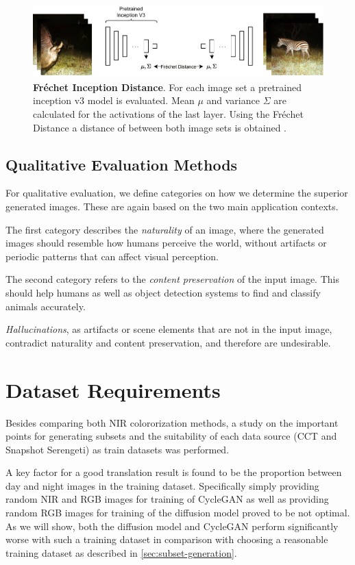 \begin{figure}[htp!]
    \centering
    \includegraphics[width=.9\textwidth]{gfx/FID.pdf}
    \caption{
        \textbf{Fréchet Inception Distance}.
        For each image set a pretrained inception v3 model is evaluated.
        Mean $\mu$ and variance $\Sigma$ are calculated for the activations of the last layer.
        Using the Fréchet Distance a distance of between both image sets is obtained \parencite{ttur}.
    }
    \label{fig:fid}
\end{figure}

\label{sec:evaluate-fid}

\subsection{Qualitative Evaluation Methods}
For qualitative evaluation, we define categories on how we determine the superior generated images. These are again based on the two main application contexts.

The first category describes the \textit{naturality} of an image, where the generated images should resemble how humans perceive the world, without artifacts or periodic patterns that can affect visual perception.

The second category refers to the \textit{content preservation} of the input image. This should help humans as well as object detection systems to find and classify animals accurately.

\textit{Hallucinations}, as artifacts or scene elements that are not in the input image, contradict naturality and content preservation, and therefore are undesirable.

\section{Dataset Requirements}
Besides comparing both NIR colororization methods, a study on the important points for generating subsets and the suitability of each data source
(CCT and Snapshot Serengeti) as train datasets was performed.

\label{sec:time-dependent-sampling}
\label{sec:diffusion-vs-cyclegan-day}
A key factor for a good translation result is found to be the proportion between day and night images in the training dataset.
Specifically simply providing random NIR and RGB images for training of CycleGAN as well as providing random RGB images for training of the diffusion model proved to be not optimal.
As we will show, both the diffusion model and CycleGAN perform significantly worse with such a training dataset in comparison with choosing a reasonable training dataset as described in \autoref{sec:subset-generation}.

